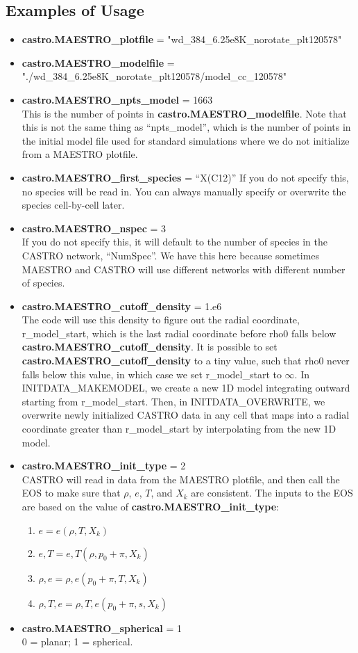 \subsection{Examples of Usage}
\begin{itemize}
\item {\bf castro.MAESTRO\_plotfile} = "wd\_384\_6.25e8K\_norotate\_plt120578"
\item {\bf castro.MAESTRO\_modelfile} = "./wd\_384\_6.25e8K\_norotate\_plt120578/model\_cc\_120578"
\item {\bf castro.MAESTRO\_npts\_model} = 1663\\
This is the number of points in {\bf castro.MAESTRO\_modelfile}.  Note that this is not the same thing as ``npts\_model'', which is the number of points in the initial model file used for standard simulations where we do not initialize from a MAESTRO plotfile.
\item {\bf castro.MAESTRO\_first\_species} = ``X(C12)''
If you do not specify this, no species will be read in.  You can always manually specify or overwrite the species cell-by-cell later.
\item {\bf castro.MAESTRO\_nspec} = 3\\
If you do not specify this, it will default to the number of species in the CASTRO network, ``NumSpec''.  We have this here because sometimes MAESTRO and CASTRO will use different networks with different number of species.
\item {\bf castro.MAESTRO\_cutoff\_density} = 1.e6\\
The code will use this density to figure out the radial coordinate, r\_model\_start, which is the last radial coordinate before rho0 falls below {\bf castro.MAESTRO\_cutoff\_density}.  It is possible to set {\bf castro.MAESTRO\_cutoff\_density} to a tiny value, such that rho0 never falls below this value, in which case we set r\_model\_start to $\infty$.  In INITDATA\_MAKEMODEL, we create a new 1D model integrating outward starting from r\_model\_start.  Then, in INITDATA\_OVERWRITE, we overwrite newly initialized CASTRO data in any cell that maps into a radial coordinate greater than r\_model\_start by interpolating from the new 1D model.
\item {\bf castro.MAESTRO\_init\_type} = 2\\
CASTRO will read in data from the MAESTRO plotfile, and then call the EOS to make sure that $\rho$, $e$, $T$, and $X_k$ are consistent.  The inputs to the EOS are based on the value of {\bf castro.MAESTRO\_init\_type}:
\begin{enumerate}
\item $e = e(\rho,T,X_k)$
\item $e,T = e,T(\rho,p_0+\pi,X_k)$
\item $\rho,e = \rho,e(p_0+\pi,T,X_k)$
\item $\rho,T,e = \rho,T,e(p_0+\pi,s,X_k)$
\end{enumerate}
\item {\bf castro.MAESTRO\_spherical} = 1\\
0 = planar; 1 = spherical.
\end{itemize}

